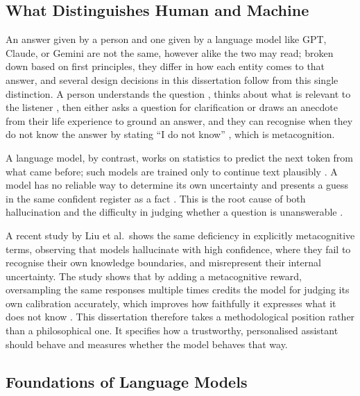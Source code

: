 \subsection{What Distinguishes Human and Machine}
\label{sec:human-vs-ai}

An answer given by a person and one given by a language model like GPT, Claude, or Gemini are not the same, however alike the two may read; broken down based on first principles, they differ in how each entity comes to that answer, and several design decisions in this dissertation follow from this single distinction. A person understands the question \cite{tomasello2008origins}, thinks about what is relevant to the listener \cite{clark1996usinglanguage, sperberwilson1995relevance}, then either asks a question for clarification or draws an anecdote from their life experience \cite{barsalou2008grounded, bruner1990acts} to ground an answer, and they can recognise when they do not know the answer by stating ``I do not know'' \cite{flavell1979metacognition}, which is metacognition. 

A language model, by contrast, works on statistics to predict the next token from what came before; such models are trained only to continue text plausibly \cite{vaswani2023attentionneed, brown2020languagemodelsfewshotlearners}. A model has no reliable way to determine its own uncertainty and presents a guess in the same confident register as a fact \cite{bender2021stochasticparrots}. This is the root cause of both hallucination \cite{ji2024surveyhallucinationnaturallanguage} and the difficulty in judging whether a question is unanswerable \cite{wen2025knowlimitssurveyabstention, kirichenko2025abstentionbenchreasoningllmsfail}. 

A recent study by Liu et al.\ shows the same deficiency in explicitly metacognitive terms, observing that models hallucinate with high confidence, where they fail to recognise their own knowledge boundaries, and misrepresent their internal uncertainty. The study shows that by adding a metacognitive reward, oversampling the same responses multiple times credits the model for judging its own calibration accurately, which improves how faithfully it expresses what it does not know \cite{liu2026reinforcementlearningmetacognitivefeedback}. This dissertation therefore takes a methodological position rather than a philosophical one. It specifies how a trustworthy, personalised assistant should behave and measures whether the model behaves that way.

\subsection{Foundations of Language Models}
\label{sec:foundations}

